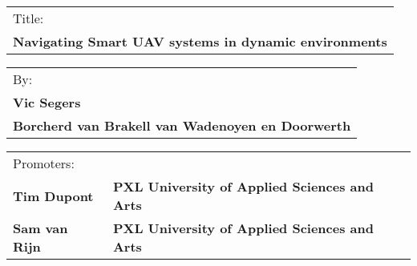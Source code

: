 \begin{tabularx}{\textwidth}{l}
  Title:\\
  \textbf{Navigating Smart UAV systems in dynamic environments}\\
\end{tabularx}

\begin{tabularx}{\textwidth}{l}
  By:\\
  \textbf{Vic Segers}\\
  \textbf{Borcherd van Brakell van Wadenoyen en Doorwerth}\\
\end{tabularx}

\begin{tabularx}{\textwidth}{l X}
  Promoters:\\
  \textbf{Tim Dupont} & \textbf{PXL University of Applied Sciences and Arts}\\
  \textbf{Sam van Rijn} & \textbf{PXL University of Applied Sciences and Arts}\\
  \hline
\end{tabularx}